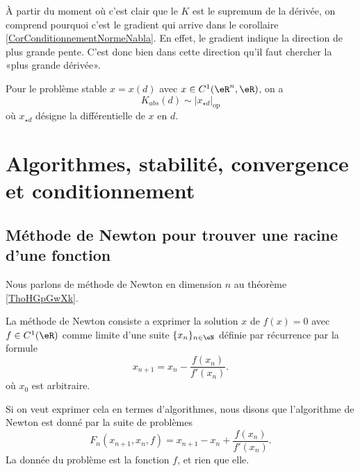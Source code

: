 À partir du moment où c'est clair que le $K$ est le supremum de la dérivée, on comprend pourquoi c'est le gradient qui arrive dans le corollaire \ref{CorConditionnementNormeNabla}. En effet, le gradient indique la direction de plus grande pente. C'est donc bien dans cette direction qu'il faut chercher la «plus grande dérivée».

\begin{proposition}	
	Pour le problème stable $x=x(d)$ avec $x\in C^1(\eR^n,\eR)$, on a
	\begin{equation}
		K_{abs}(d)\sim|x_{\star d}|_{\mbox{op}}
	\end{equation}
	où $x_{\star d}$ désigne la différentielle de $x$ en $d$.
\end{proposition}

\section{Algorithmes, stabilité, convergence et conditionnement}

\subsection{Méthode de Newton pour trouver une racine d'une fonction}
\label{SubSecMethodeNewton}

Nous parlons de méthode de Newton en dimension \( n\) au théorème \ref{ThoHGpGwXk}.

La méthode de Newton consiste a exprimer la solution $x$ de $f(x)=0$ avec $f\in C^1(\eR)$ comme limite d'une suite $\{x_n\}_{n\in\eN}$ définie par récurrence par la formule
\begin{equation}
	x_{n+1}=x_n-\frac{f(x_n)}{f'(x_n)}.
\end{equation}
où $x_0$ est arbitraire.

Si on veut exprimer cela en termes d'algorithmes, nous disons que l'algorithme de Newton est donné par la suite de problèmes
\begin{equation}		\label{EqFPourNewtonUn}
	F_n(x_{n+1},x_n,f)=x_{n+1}-x_n+\frac{ f(x_n) }{ f'(x_n) }.
\end{equation}
La donnée du problème est la fonction $f$, et rien que elle.

